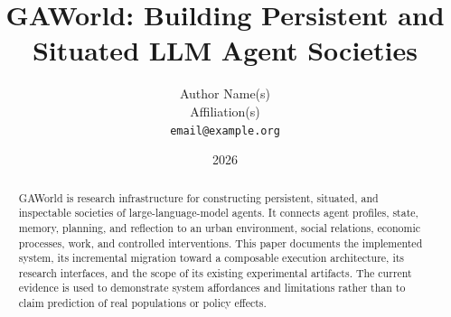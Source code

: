 \documentclass[11pt]{article}
\title{GAWorld: Building Persistent and Situated LLM Agent Societies}
\author{Author Name(s)\\Affiliation(s)\\\texttt{email@example.org}}
\date{2026}
\begin{document}
\maketitle

\begin{abstract}
GAWorld is research infrastructure for constructing persistent, situated, and inspectable societies of
large-language-model agents. It connects agent profiles, state, memory, planning, and reflection to an
urban environment, social relations, economic processes, work, and controlled interventions. This paper
documents the implemented system, its incremental migration toward a composable execution architecture,
its research interfaces, and the scope of its existing experimental artifacts. The current evidence is used
to demonstrate system affordances and limitations rather than to claim prediction of real populations or
policy effects.
\end{abstract}
















\end{document}
